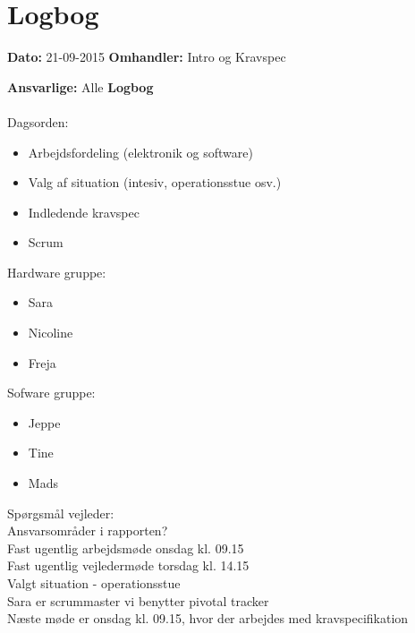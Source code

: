 \chapter{Logbog}

\textbf{Dato:} 21-09-2015
\textbf{Omhandler:} Intro og Kravspec

\textbf{Ansvarlige:} Alle
\textbf{Logbog}
\\
\\
Dagsorden:
\begin{itemize}
	\item Arbejdsfordeling (elektronik og software)
	\item Valg af situation (intesiv, operationsstue osv.)
	\item Indledende kravspec
	\item Scrum
\end{itemize}

Hardware gruppe:
\begin{itemize}
	\item Sara
	\item Nicoline
	\item Freja
\end{itemize}

Sofware gruppe:
\begin{itemize}
	\item Jeppe 
	\item Tine
	\item Mads
\end{itemize}

Spørgsmål vejleder: \\
Ansvarsområder i rapporten?\\
Fast ugentlig arbejdsmøde onsdag kl. 09.15\\
Fast ugentlig vejledermøde torsdag kl. 14.15\\

Valgt situation - operationsstue\\
Sara er scrummaster vi benytter pivotal tracker
\\
Næste møde er onsdag kl. 09.15, hvor der arbejdes med kravspecifikation\\